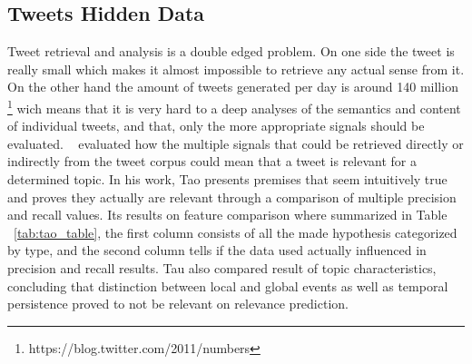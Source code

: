 \subsection{Tweets Hidden Data} 
\label{sub:the_tweet}
Tweet retrieval and analysis is a double edged problem. On one side the tweet is really small which makes it almost impossible to retrieve any actual sense from it. On the other hand the amount of tweets generated per day is around 140 million \footnote{https://blog.twitter.com/2011/numbers} wich means that it is very hard to a deep analyses of the semantics and content of individual tweets, and that, only the more appropriate signals should be evaluated.
~\citet{Tao2012} evaluated how the multiple signals that could be retrieved directly or indirectly from the tweet corpus could mean that a tweet is relevant for a determined topic. In his work, Tao presents premises that seem intuitively true and proves they actually are relevant through a comparison of multiple precision and recall values. Its results on feature comparison where summarized in Table ~\ref{tab:tao_table}, the first column consists of all the made hypothesis categorized by type, and the second column tells if the data used actually influenced in precision and recall results. Tau also compared result of topic characteristics, concluding that distinction between local and global events as well as temporal persistence proved to not be relevant on relevance prediction.

